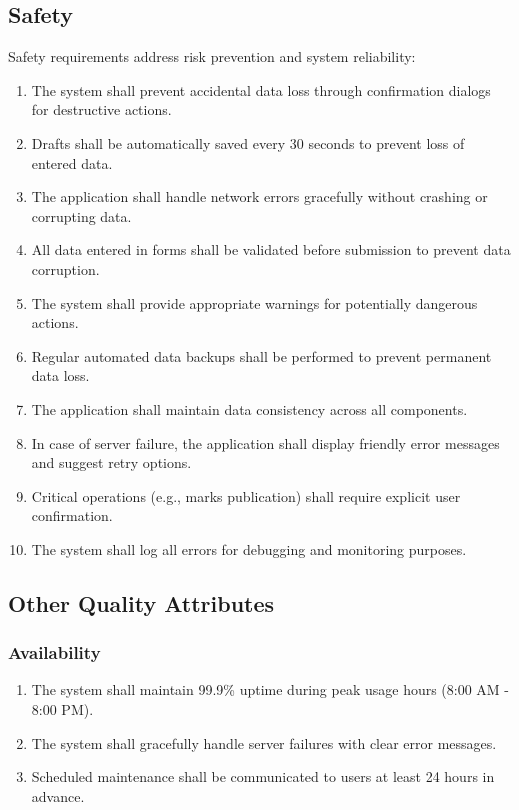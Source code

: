 \documentclass[12pt,a4paper]{article}
\begin{document}
\subsection{Safety}

Safety requirements address risk prevention and system reliability:

\begin{enumerate}[leftmargin=*, label=\textbf{SA-\arabic*.}, itemsep=4pt]
  \item The system shall prevent accidental data loss through confirmation dialogs for destructive actions.
  \item Drafts shall be automatically saved every 30 seconds to prevent loss of entered data.
  \item The application shall handle network errors gracefully without crashing or corrupting data.
  \item All data entered in forms shall be validated before submission to prevent data corruption.
  \item The system shall provide appropriate warnings for potentially dangerous actions.
  \item Regular automated data backups shall be performed to prevent permanent data loss.
  \item The application shall maintain data consistency across all components.
  \item In case of server failure, the application shall display friendly error messages and suggest retry options.
  \item Critical operations (e.g., marks publication) shall require explicit user confirmation.
  \item The system shall log all errors for debugging and monitoring purposes.
\end{enumerate}

\subsection{Other Quality Attributes}

\subsubsection{Availability}

\begin{enumerate}[leftmargin=*, label=\textbf{AV-\arabic*.}, itemsep=4pt]
  \item The system shall maintain 99.9\% uptime during peak usage hours (8:00 AM - 8:00 PM).
  \item The system shall gracefully handle server failures with clear error messages.
  \item Scheduled maintenance shall be communicated to users at least 24 hours in advance.
\end{enumerate}
\end{document}
